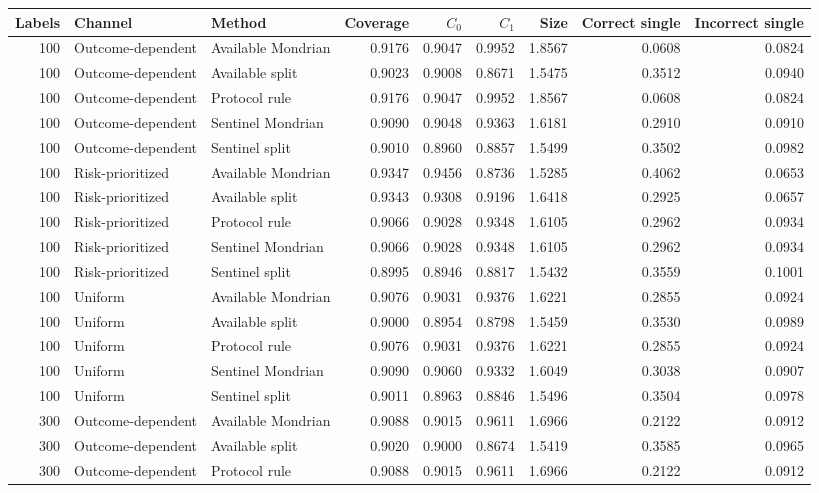 \begin{tabular}{rllrrrrrr}
\toprule
Labels & Channel & Method & Coverage & $C_0$ & $C_1$ & Size & Correct single & Incorrect single \\
\midrule
100 & Outcome-dependent & Available Mondrian & 0.9176 & 0.9047 & 0.9952 & 1.8567 & 0.0608 & 0.0824 \\
100 & Outcome-dependent & Available split & 0.9023 & 0.9008 & 0.8671 & 1.5475 & 0.3512 & 0.0940 \\
100 & Outcome-dependent & Protocol rule & 0.9176 & 0.9047 & 0.9952 & 1.8567 & 0.0608 & 0.0824 \\
100 & Outcome-dependent & Sentinel Mondrian & 0.9090 & 0.9048 & 0.9363 & 1.6181 & 0.2910 & 0.0910 \\
100 & Outcome-dependent & Sentinel split & 0.9010 & 0.8960 & 0.8857 & 1.5499 & 0.3502 & 0.0982 \\
100 & Risk-prioritized & Available Mondrian & 0.9347 & 0.9456 & 0.8736 & 1.5285 & 0.4062 & 0.0653 \\
100 & Risk-prioritized & Available split & 0.9343 & 0.9308 & 0.9196 & 1.6418 & 0.2925 & 0.0657 \\
100 & Risk-prioritized & Protocol rule & 0.9066 & 0.9028 & 0.9348 & 1.6105 & 0.2962 & 0.0934 \\
100 & Risk-prioritized & Sentinel Mondrian & 0.9066 & 0.9028 & 0.9348 & 1.6105 & 0.2962 & 0.0934 \\
100 & Risk-prioritized & Sentinel split & 0.8995 & 0.8946 & 0.8817 & 1.5432 & 0.3559 & 0.1001 \\
100 & Uniform & Available Mondrian & 0.9076 & 0.9031 & 0.9376 & 1.6221 & 0.2855 & 0.0924 \\
100 & Uniform & Available split & 0.9000 & 0.8954 & 0.8798 & 1.5459 & 0.3530 & 0.0989 \\
100 & Uniform & Protocol rule & 0.9076 & 0.9031 & 0.9376 & 1.6221 & 0.2855 & 0.0924 \\
100 & Uniform & Sentinel Mondrian & 0.9090 & 0.9060 & 0.9332 & 1.6049 & 0.3038 & 0.0907 \\
100 & Uniform & Sentinel split & 0.9011 & 0.8963 & 0.8846 & 1.5496 & 0.3504 & 0.0978 \\
300 & Outcome-dependent & Available Mondrian & 0.9088 & 0.9015 & 0.9611 & 1.6966 & 0.2122 & 0.0912 \\
300 & Outcome-dependent & Available split & 0.9020 & 0.9000 & 0.8674 & 1.5419 & 0.3585 & 0.0965 \\
300 & Outcome-dependent & Protocol rule & 0.9088 & 0.9015 & 0.9611 & 1.6966 & 0.2122 & 0.0912 \\

\end{tabular}
